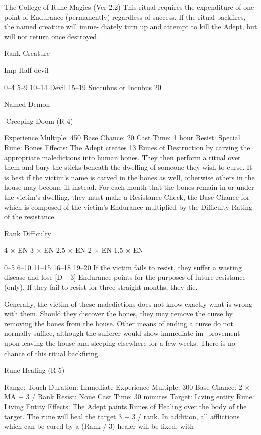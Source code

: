 \begin{Chapter}{The College of Rune Magics (Ver 2.2)}
This ritual requires the expenditure of one point of 
Endurance  (permanently)  regardless  of  success.  If 
the ritual backfires, the named creature will imme-
diately  turn  up  and  attempt  to  kill  the  Adept,  but 
will not return once destroyed. 

Rank  Creature 

Imp 
Half devil 

0–4 
5–9 
10–14  Devil 
15–19  Succubus or Incubus 
20 

Named Demon 

Creeping Doom (R-4) 

Experience Multiple: 450 
Base Chance: 20%
Cast Time: 1 hour 
Resist: Special  
Rune: Bones 
Effects: The Adept creates 13 Runes of Destruction 
by carving the appropriate maledictions into human 
bones.  They  then  perform  a  ritual  over  them  and 
bury  the  sticks  beneath  the  dwelling  of  someone 
they wish to curse. It is best if the victim’s name is 
carved in the bones as well, otherwise others in the 
house may become ill instead. For each month that 
the bones remain in or under the victim’s dwelling, 
they  must  make  a  Resistance  Check,  the  Base 
Chance  for  which  is  composed  of  the  victim’s 
Endurance  multiplied  by  the  Difficulty  Rating  of 
the resistance. 

Rank  Difficulty 

4 × EN 
3 × EN 
2.5 × EN 
2 × EN 
1.5 × EN 

0–5 
6–10 
11–15 
16–18 
19–20 
If  the  victim  fails  to  resist,  they  suffer  a  wasting 
disease  and  lose  [D  –  3]  Endurance  points  for  the 
purposes  of  future  resistance  (only).  If  they  fail  to 
resist for three straight months, they die. 

Generally,  the  victim  of  these  maledictions  does 
not know exactly what is wrong with them. Should 
they  discover  the  bones,  they  may  remove  the 
curse by removing the bones from the house. Other 
means  of  ending  a  curse  do  not  normally  suffice, 
although  the  sufferer  would  show  immediate  im-
provement  upon  leaving  the  house  and  sleeping 
elsewhere  for  a  few  weeks.  There  is  no  chance  of 
this ritual backfiring. 

Rune Healing (R-5) 

Range: Touch 
Duration: Immediate 
Experience Multiple: 300 
Base Chance: 2 × MA + 3 / Rank 
Resist: None 
Cast Time: 30 minutes 
Target: Living entity  
Rune: Living Entity 
Effects:  The  Adept  paints  Runes  of  Healing  over 
the body of the target. The rune will heal the target 
3  +  3  /  rank.  In  addition,  all  afflictions  which  can 
be cured by a (Rank / 3) healer will be fixed, with 


\end{Chapter}
